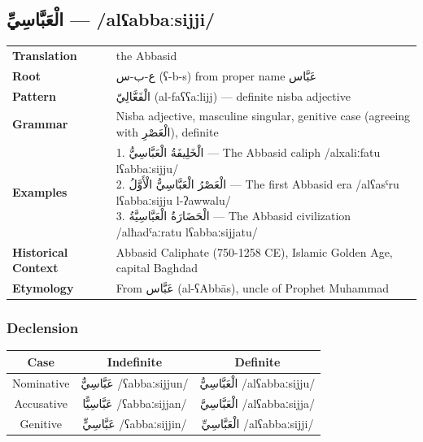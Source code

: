 \documentclass[letterpaper,12pt]{article}
\begin{document}
\subsection{\textarabic{الْعَبَّاسِيِّ} — /alʕabbaːsijji/}
\begin{tabular}{p{3cm}p{10cm}}
\toprule
\textbf{Translation} & the Abbasid \\
\textbf{Root} & \textarabic{ع-ب-س} (ʕ-b-s) from proper name \textarabic{عَبَّاس} \\
\textbf{Pattern} & \textarabic{الْفَعَّالِيّ} (al-faʕʕaːlijj) — definite nisba adjective \\
\textbf{Grammar} & Nisba adjective, masculine singular, genitive case (agreeing with \textarabic{الْعَصْرِ}), definite \\
\midrule
\textbf{Examples} & \makecell[l]{\parbox{9.5cm}{
1. \textarabic{الْخَلِيفَةُ الْعَبَّاسِيُّ} — The Abbasid caliph /alxaliːfatu lʕabbaːsijju/\\
2. \textarabic{الْعَصْرُ الْعَبَّاسِيُّ الْأَوَّلُ} — The first Abbasid era /alʕasˤru lʕabbaːsijju l-ʔawwalu/\\
3. \textarabic{الْحَضَارَةُ الْعَبَّاسِيَّةُ} — The Abbasid civilization /alħadˤaːratu lʕabbaːsijjatu/
}} \\
\midrule
\textbf{Historical Context} & Abbasid Caliphate (750-1258 CE), Islamic Golden Age, capital Baghdad \\
\textbf{Etymology} & From \textarabic{عَبَّاس} (al-ʕAbbās), uncle of Prophet Muhammad \\
\bottomrule
\end{tabular}

\subsubsection*{Declension}
\begin{tabular}{|c|c|c|}
\hline
\textbf{Case} & \textbf{Indefinite} & \textbf{Definite} \\
\hline
Nominative & \textarabic{عَبَّاسِيٌّ} /ʕabbaːsijjun/ & \textarabic{الْعَبَّاسِيُّ} /alʕabbaːsijju/ \\
\hline
Accusative & \textarabic{عَبَّاسِيًّا} /ʕabbaːsijjan/ & \textarabic{الْعَبَّاسِيَّ} /alʕabbaːsijja/ \\
\hline
Genitive & \textarabic{عَبَّاسِيٍّ} /ʕabbaːsijjin/ & \textarabic{الْعَبَّاسِيِّ} /alʕabbaːsijji/ \\
\hline
\end{tabular}
\end{document}
